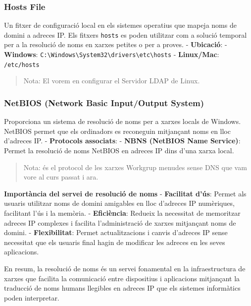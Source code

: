 \documentclass[
  a4paper,
]{article}
\begin{document}
\subsubsection{Hosts File}\label{hosts-file}

Un fitxer de configuració local en els sistemes operatius que mapeja
noms de domini a adreces IP. Els fitxers \texttt{hosts} es poden
utilitzar com a solució temporal per a la resolució de noms en xarxes
petites o per a proves. - \textbf{Ubicació}: - \textbf{Windows}:
\texttt{C:\textbackslash{}Windows\textbackslash{}System32\textbackslash{}drivers\textbackslash{}etc\textbackslash{}hosts}
- \textbf{Linux/Mac}: \texttt{/etc/hosts}

\begin{quote}
Nota: El vorem en configurar el Servidor LDAP de Linux.
\end{quote}

\subsubsection{NetBIOS (Network Basic Input/Output
System)}\label{netbios-network-basic-inputoutput-system}

Proporciona un sistema de resolució de noms per a xarxes locals de
Windows. NetBIOS permet que els ordinadors es reconeguin mitjançant noms
en lloc d'adreces IP. - \textbf{Protocols associats}: - \textbf{NBNS
(NetBIOS Name Service)}: Permet la resolució de noms NetBIOS en adreces
IP dins d'una xarxa local.

\begin{quote}
Nota: és el protocol de les xarxes Workgrup menudes sense DNS que vam
vore al curs passat i ara.
\end{quote}

\textbf{Importància del servei de resolució de noms} - \textbf{Facilitat
d'ús}: Permet als usuaris utilitzar noms de domini amigables en lloc
d'adreces IP numèriques, facilitant l'ús i la memòria. -
\textbf{Eficiència}: Redueix la necessitat de memoritzar adreces IP
complexes i facilita l'administració de xarxes mitjançant noms de
domini. - \textbf{Flexibilitat}: Permet actualitzacions i canvis
d'adreces IP sense necessitat que els usuaris final hagin de modificar
les adreces en les seves aplicacions.

En resum, la resolució de noms és un servei fonamental en la
infraestructura de xarxes que facilita la comunicació entre dispositius
i aplicacions mitjançant la traducció de noms humans llegibles en
adreces IP que els sistemes informàtics poden interpretar.
\end{document}
